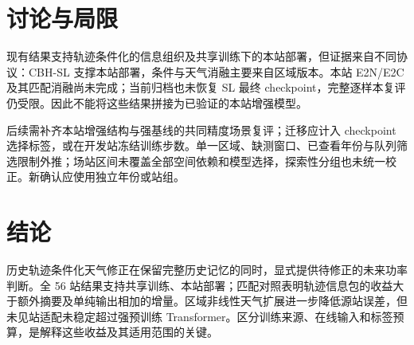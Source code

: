\section{讨论与局限}
现有结果支持轨迹条件化的信息组织及共享训练下的本站部署，但证据来自不同协议：CBH-SL 支撑本站部署，条件与天气消融主要来自区域版本。本站 E2N/E2C 及其匹配消融尚未完成；当前归档也未恢复 SL 最终 checkpoint，完整逐样本复评仍受限。因此不能将这些结果拼接为已验证的本站增强模型。

后续需补齐本站增强结构与强基线的共同精度场景复评；迁移应计入 checkpoint 选择标签，或在开发站冻结训练步数。单一区域、缺测窗口、已查看年份与队列筛选限制外推；场站区间未覆盖全部空间依赖和模型选择，探索性分组也未统一校正。新确认应使用独立年份或站组。

\section{结论}
历史轨迹条件化天气修正在保留完整历史记忆的同时，显式提供待修正的未来功率判断。全 56 站结果支持共享训练、本站部署；匹配对照表明轨迹信息包的收益大于额外摘要及单纯输出相加的增量。区域非线性天气扩展进一步降低源站误差，但未见站适配未稳定超过强预训练 Transformer。区分训练来源、在线输入和标签预算，是解释这些收益及其适用范围的关键。
